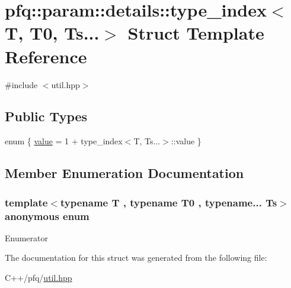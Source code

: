 \hypertarget{structpfq_1_1param_1_1details_1_1type__index_3_01T_00_01T0_00_01Ts_8_8_8_4}{\section{pfq\+:\+:param\+:\+:details\+:\+:type\+\_\+index$<$ T, T0, Ts...$>$ Struct Template Reference}
\label{structpfq_1_1param_1_1details_1_1type__index_3_01T_00_01T0_00_01Ts_8_8_8_4}
}


{\ttfamily \#include $<$util.\+hpp$>$}

\subsection*{Public Types}
\begin{DoxyCompactItemize}
\item 
enum \{ \hyperlink{structpfq_1_1param_1_1details_1_1type__index_3_01T_00_01T0_00_01Ts_8_8_8_4_a9107ca364fa02c631aa122a5756a88b8a462a8ffc60437747c76392be250281a1}{value} = 1 + type\+\_\+index$<$T, Ts...$>$\+:\+:value
 \}
\end{DoxyCompactItemize}


\subsection{Member Enumeration Documentation}
\hypertarget{structpfq_1_1param_1_1details_1_1type__index_3_01T_00_01T0_00_01Ts_8_8_8_4_a9107ca364fa02c631aa122a5756a88b8}{\subsubsection[{anonymous enum}]{\setlength{\rightskip}{0pt plus 5cm}template$<$typename T , typename T0 , typename... Ts$>$ anonymous enum}}\label{structpfq_1_1param_1_1details_1_1type__index_3_01T_00_01T0_00_01Ts_8_8_8_4_a9107ca364fa02c631aa122a5756a88b8}
\begin{Desc}
\item[Enumerator]\par
\begin{description}
\item[{\em 
\hypertarget{structpfq_1_1param_1_1details_1_1type__index_3_01T_00_01T0_00_01Ts_8_8_8_4_a9107ca364fa02c631aa122a5756a88b8a462a8ffc60437747c76392be250281a1}{value}\label{structpfq_1_1param_1_1details_1_1type__index_3_01T_00_01T0_00_01Ts_8_8_8_4_a9107ca364fa02c631aa122a5756a88b8a462a8ffc60437747c76392be250281a1}
}]\end{description}
\end{Desc}


The documentation for this struct was generated from the following file\+:\begin{DoxyCompactItemize}
\item 
C++/pfq/\hyperlink{util_8hpp}{util.\+hpp}\end{DoxyCompactItemize}
